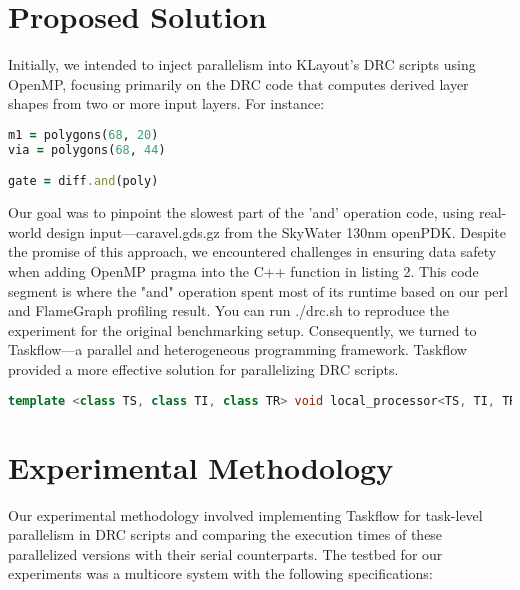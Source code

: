 \documentclass[sigconf]{acmart}
\begin{document}
\section{Proposed Solution}
Initially, we intended to inject parallelism into KLayout's DRC scripts using OpenMP, focusing primarily on the DRC code that computes derived layer shapes from two or more input layers. For instance:

\begin{lstlisting}[language=Ruby, caption=DRC code used for benchmarking in KLayout, label=lst:sample_drc_code]
m1 = polygons(68, 20)
via = polygons(68, 44)

gate = diff.and(poly)
\end{lstlisting}

Our goal was to pinpoint the slowest part of the 'and' operation code, using real-world design input—caravel.gds.gz from the SkyWater 130nm openPDK. Despite the promise of this approach, we encountered challenges in ensuring data safety when adding OpenMP pragma into the C++ function in listing 2. This code segment is where the "and" operation spent most of its runtime based on our perl and FlameGraph\cite{flamegraph}  profiling result. You can run ./drc.sh to reproduce the experiment for the original benchmarking setup.
\newline
Consequently, we turned to Taskflow—a parallel and heterogeneous programming framework. Taskflow provided a more effective solution for parallelizing DRC scripts.

\newpage
  \begin{lstlisting}[language=C++, caption=dbHierProcessor.cc,  label=code that does and DRC operation]
  template <class TS, class TI, class TR> void local_processor<TS, TI, TR>::compute_local_cell (const db::local_processor_contexts<TS, TI, TR> &contexts, db::Cell *subject_cell, const db::Cell *intruder_cell, const local_operation<TS, TI, TR> *op, const typename local_processor_cell_contexts<TS, TI, TR>::context_key_type &intruders, std::vector<std::unordered_set<TR> > &result) const {/*...*/}
  \end{lstlisting}




  
    \section{Experimental Methodology}
    Our experimental methodology involved implementing Taskflow for task-level parallelism in DRC scripts and comparing the execution times of these parallelized versions with their serial counterparts. The testbed for our experiments was a multicore system with the following specifications:
    
\end{document}
